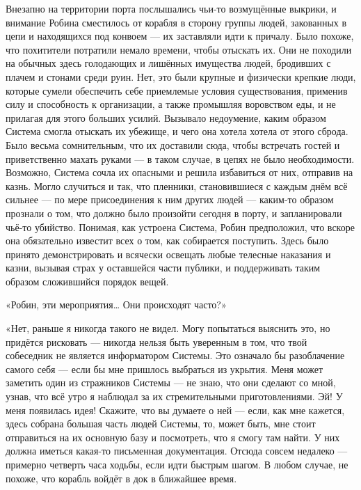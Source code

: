 \documentclass[a4paper,12pt]{book}
\begin{document}
\par
Внезапно на территории порта послышались чьи-то возмущённые выкрики, и внимание Робина сместилось от корабля в сторону группы людей, закованных в цепи и находящихся под конвоем — их заставляли идти к причалу. Было похоже, что похитители потратили немало времени, чтобы отыскать их. Они не походили на обычных здесь голодающих и лишённых имущества людей, бродивших с плачем и стонами среди руин. Нет, это были крупные и физически крепкие люди, которые сумели обеспечить себе приемлемые условия существования, применив силу и способность к организации, а также промышляя воровством еды, и не прилагая для этого больших усилий. Вызывало недоумение, каким образом Система смогла отыскать их убежище, и чего она хотела хотела от этого сброда. Было весьма сомнительным, что их доставили сюда, чтобы встречать гостей и приветственно махать руками — в таком случае, в цепях не было необходимости. Возможно, Система сочла их опасными и решила избавиться от них, отправив на казнь. Могло случиться и так, что пленники, становившиеся с каждым днём всё сильнее — по мере присоединения к ним других людей — каким-то образом прознали о том, что должно было произойти сегодня в порту, и запланировали чьё-то убийство. Понимая, как устроена Система, Робин предположил, что вскоре она обязательно известит всех о том, как собирается поступить. Здесь было принято демонстрировать и всячески освещать любые телесные наказания и казни, вызывая страх у оставшейся части публики, и поддерживать таким образом сложившийся порядок вещей.\\
\par
«Робин, эти мероприятия… Они происходят часто?»
\par
«Нет, раньше я никогда такого не видел. Могу попытаться выяснить это, но придётся рисковать — никогда нельзя быть уверенным в том, что твой собеседник не является информатором Системы. Это означало бы разоблачение самого себя — если бы мне пришлось выбраться из укрытия. Меня может заметить один из стражников Системы — не знаю, что они сделают со мной, узнав, что всё утро я наблюдал за их стремительными приготовлениями. Эй! У меня появилась идея! Скажите, что вы думаете о ней — если, как мне кажется, здесь собрана большая часть людей Системы, то, может быть, мне стоит отправиться на их основную базу и посмотреть, что я смогу там найти. У них должна иметься какая-то письменная документация. Отсюда совсем недалеко — примерно четверть часа ходьбы, если идти быстрым шагом. В любом случае, не похоже, что корабль войдёт в док в ближайшее время.
\par
\end{document}

